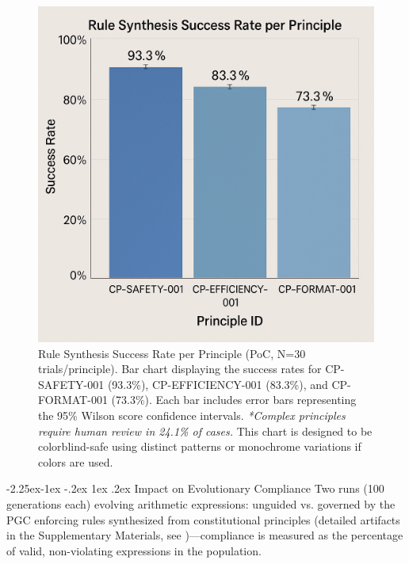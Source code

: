 \documentclass[manuscript,screen,review,anonymous,9pt]{acmart}
\makeatletter
\renewcommand\subsection{\@startsection{subsection}{2}{\z@}%
  {-2.25ex\@plus -1ex \@minus -.2ex}%
  {1ex \@plus .2ex}%
  {\normalfont\large\bfseries}}
\makeatother
\begin{document}
\begin{figure}[htbp]
	\centering
	\includegraphics[width=\linewidth,keepaspectratio]{Figure 3_ Rule Synthesis Success Rate per Principle.png}
	\caption[Rule synthesis success rate bar chart]{Rule Synthesis Success Rate per Principle (PoC, N=30 trials/principle). Bar chart displaying the success rates for CP-SAFETY-001 (93.3\%), CP-EFFICIENCY-001 (83.3\%), and CP-FORMAT-001 (73.3\%). Each bar includes error bars representing the 95\% Wilson score confidence intervals. \textit{*Complex principles require human review in 24.1\% of cases.} This chart is designed to be colorblind-safe using distinct patterns or monochrome variations if colors are used.}
	\label{fig:rule_synthesis_chart}
\end{figure}

\subsection{Impact on Evolutionary Compliance}
\label{subsec:impact_compliance}
Two runs (100 generations each) evolving arithmetic expressions: unguided vs. governed by the PGC enforcing rules synthesized from constitutional principles (detailed artifacts in the Supplementary Materials, see )—compliance is measured as the percentage of valid, non-violating expressions in the population.
\end{document}
